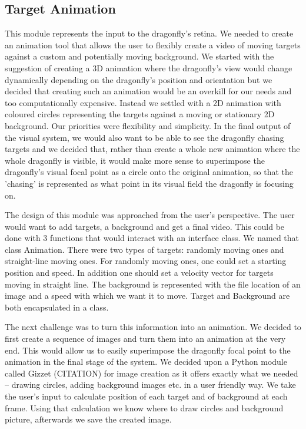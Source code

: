 \documentclass[a4paper,11pt]{article}
\begin{document}
\subsection{Target Animation}
This module represents the input to the dragonfly's retina. We needed to create an animation tool that allows the user to flexibly create a video of moving targets against a custom and potentially moving background. We started with the suggestion of creating a 3D animation where the dragonfly's view would change dynamically depending on the dragonfly's position and orientation but we decided that creating such an animation would be an overkill for our needs and too computationally expensive. Instead we settled with a 2D animation with coloured circles representing the targets against a moving or stationary 2D background. Our priorities were flexibility and simplicity. In the final output of the visual system, we would also want to be able to see the dragonfly chasing targets and we decided that, rather than create a whole new animation where the whole dragonfly is visible, it would make more sense to superimpose the dragonfly's visual focal point as a circle onto the original animation, so that the 'chasing' is represented as what point in its visual field the dragonfly is focusing on.  

The design of this module was approached from the user's perspective. The user would want to add targets, a background and get a final video. This could be done with 3 functions that would interact with an interface class. We named that class Animation. There were two types of targets: randomly moving ones and straight-line moving ones. For randomly moving ones, one could set a starting position and speed. In addition one should set a velocity vector for targets moving in straight line. The background is represented with the file location of an image and a speed with which we want it to move. Target and Background are both encapsulated in a class.

The next challenge was to turn this information into an animation. We decided to first create a sequence of images and turn them into an animation at the very end. This would allow us to easily superimpose the dragonfly focal point to the animation in the final stage of the system. We decided upon a Python module called Gizzet (CITATION) for image creation as it offers exactly what we needed – drawing circles, adding background images etc. in a user friendly way. We take the user's input to calculate position of each target and of background at each frame. Using that calculation we know where to draw circles and background picture, afterwards we save the created image.
\end{document}
